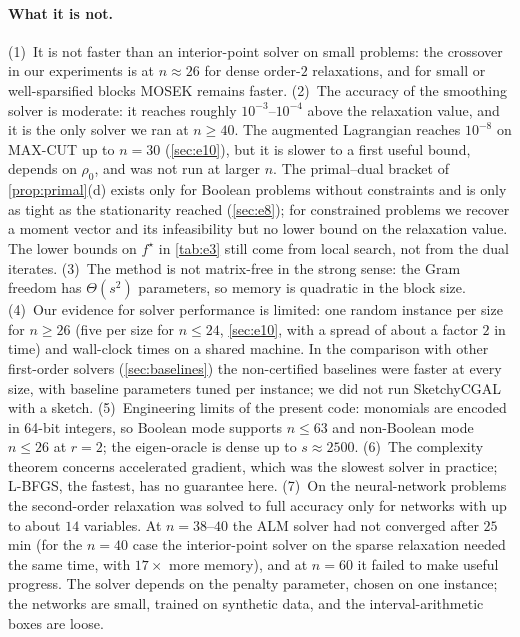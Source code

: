 \documentclass[a4paper,11pt]{article}
\theoremstyle{plain}
\theoremstyle{definition}
\theoremstyle{remark}
\begin{document}
\paragraph{What it is not.}
(1)~It is not faster than an interior-point solver on small problems: the crossover in our experiments is at $n\approx26$ for dense order-$2$ relaxations, and for small or well-sparsified blocks MOSEK remains faster.
(2)~The accuracy of the smoothing solver is moderate: it reaches roughly $10^{-3}$--$10^{-4}$ above the relaxation value, and it is the only solver we ran at $n\ge40$. The augmented Lagrangian reaches $10^{-8}$ on MAX-CUT up to $n=30$ (\cref{sec:e10}), but it is slower to a first useful bound, depends on $\rho_0$, and was not run at larger $n$. The primal--dual bracket of \cref{prop:primal}(d) exists only for Boolean problems without constraints and is only as tight as the stationarity reached (\cref{sec:e8}); for constrained problems we recover a moment vector and its infeasibility but no lower bound on the relaxation value. The lower bounds on $f^\star$ in \cref{tab:e3} still come from local search, not from the dual iterates.
(3)~The method is not matrix-free in the strong sense: the Gram freedom has $\Theta(s^2)$ parameters, so memory is quadratic in the block size.
(4)~Our evidence for solver performance is limited: one random instance per size for $n\ge26$ (five per size for $n\le24$, \cref{sec:e10}, with a spread of about a factor $2$ in time) and wall-clock times on a shared machine. In the comparison with other first-order solvers (\cref{sec:baselines}) the non-certified baselines were faster at every size, with baseline parameters tuned per instance; we did not run SketchyCGAL with a sketch.
(5)~Engineering limits of the present code: monomials are encoded in 64-bit integers, so Boolean mode supports $n\le63$ and non-Boolean mode $n\le26$ at $r=2$; the eigen-oracle is dense up to $s\approx2500$.
(6)~The complexity theorem concerns accelerated gradient, which was the slowest solver in practice; L-BFGS, the fastest, has no guarantee here.
(7)~On the neural-network problems the second-order relaxation was solved to full accuracy only for networks with up to about $14$ variables. At $n=38$--$40$ the ALM solver had not converged after $25$\,min (for the $n=40$ case the interior-point solver on the sparse relaxation needed the same time, with $17\times$ more memory), and at $n=60$ it failed to make useful progress. The solver depends on the penalty parameter, chosen on one instance; the networks are small, trained on synthetic data, and the interval-arithmetic boxes are loose.
\end{document}
